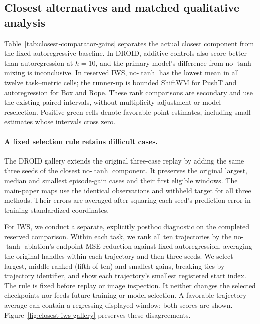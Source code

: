 \subsection{Closest alternatives and matched qualitative analysis}
\label{app:closest-qualitative}
Table~\ref{tab:closest-comparator-gains} separates the actual closest component
from the fixed autoregressive baseline. In DROID, additive controls also score
better than autoregression at $h=10$, and the primary model's difference from no-$\tanh$
mixing is inconclusive. In reserved IWS, no-$\tanh$ has the lowest mean in all
twelve task--metric cells; the runner-up is bounded ShiftWM for PushT and
autoregression for Box and Rope. These rank comparisons are secondary and use
the existing paired intervals, without multiplicity adjustment or model
reselection. Positive green cells denote favorable point estimates, including
small estimates whose intervals cross zero.



\paragraph{A fixed selection rule retains difficult cases.}
The DROID gallery extends the original three-case replay by adding the same
three seeds of the closest no-$\tanh$ component. It preserves the original
largest, median and smallest episode-gain cases and their first eligible
windows. The main-paper maps use the identical observations and withheld
target for all three methods. Their errors are averaged after squaring each
seed's prediction error in training-standardized coordinates.

For IWS, we conduct a separate, explicitly posthoc diagnostic on the completed
reserved comparison. Within each task, we rank all ten trajectories by the
no-$\tanh$ ablation's endpoint MSE reduction against fixed autoregression,
averaging the original handles within each trajectory and then three seeds.
We select largest, middle-ranked (fifth of ten) and smallest gains, breaking ties by trajectory
identifier, and show each trajectory's smallest registered start index. The
rule is fixed before replay or image inspection. It neither changes the
selected checkpoints nor feeds future training or model selection. A favorable
trajectory average can contain a regressing displayed window; both scores are
shown. Figure~\ref{fig:closest-iws-gallery} preserves these disagreements.



